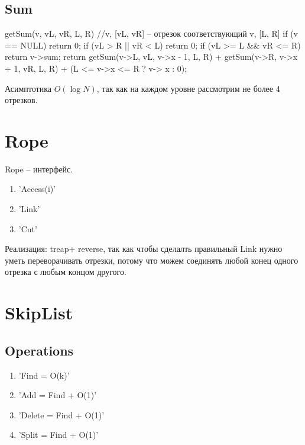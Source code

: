 \subsection{Sum}

\begin{cppcode}
getSum(v, vL, vR, L, R) //v, [vL, vR] -- отрезок соответствующий v, [L, R]
{
	if (v == NULL)
		return 0;
	if (vL > R || vR <  L)
		return 0;
	if (vL >= L && vR <= R)
		return v->sum;
	return getSum(v->L, vL, v->x - 1, L, R)
		+ getSum(v->R, v->x + 1, vR, L, R)
			+ (L <= v->x <= R ? v-> x : 0);
}
\end{cppcode}

Асимптотика $O(\log N)$, так как на каждом уровне рассмотрим не более 4 отрезков.

\section{Rope}


\begin{Def}
	Rope -- интерфейс.
	\begin{enumerate}
		\item \cpp'Access(i)'
		\item \cpp'Link'
		\item \cpp'Cut'
	\end{enumerate}
\end{Def}

Реализация: treap+ reverse, так как чтобы сделалть правильный Link нужно уметь переворачивать отрезки,
потому что можем соединять любой конец одного отрезка с любым концом другого.

 
\section{SkipList}
 

\subsection{Operations}
 
\begin{enumerate}
	\item \cpp'Find = O(k)'
	\item \cpp'Add = Find + O(1)'
	\item \cpp'Delete = Find + O(1)'
	\item \cpp'Split = Find + O(1)'
\end{enumerate}

